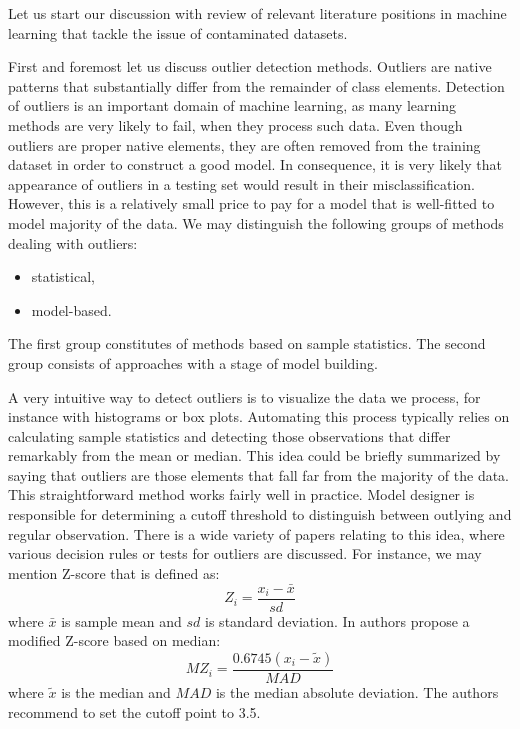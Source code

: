 \documentclass{llncs}
\begin{document}
Let us start our discussion with review of relevant literature positions in machine learning that tackle the issue of contaminated datasets. 

First and foremost let us discuss outlier detection methods. Outliers are native patterns that substantially differ from the remainder of class elements. Detection of outliers is an important domain of machine learning, as many learning methods are very likely to fail, when they process such data. Even though outliers are proper native elements, they are often removed from the training dataset in order to construct a good model. In consequence, it is very likely that appearance of outliers in a testing set would result in their misclassification. However, this is a relatively small price to pay for a model that is well-fitted to model majority of the data. We may distinguish the following groups of methods dealing with outliers:
\begin{itemize}
  \item statistical,
  \item model-based.
\end{itemize}

The first group constitutes of methods based on sample statistics. The second group consists of approaches with a stage of model building. 
 
A very intuitive way to detect outliers is to visualize the data we process, for instance with histograms or box plots. Automating this process typically relies on calculating sample statistics and detecting those observations that differ remarkably from the mean or median. This idea could be briefly summarized by saying that outliers are those elements that fall far from the majority of the data. This straightforward method works fairly well in practice. Model designer is responsible for determining a cutoff threshold to distinguish between outlying and regular observation. There is a wide variety of papers relating to this idea, where various decision rules or tests for outliers are discussed. For instance, we may mention Z-score that is defined as:
\begin{equation}\label{eqn:zscore}
    Z_i = \frac{x_i - \bar{x}}{sd}
\end{equation}
where $\bar{x}$ is sample mean and $sd$ is standard deviation. In \cite{IglewiczHoaglin1993} authors propose a modified Z-score based on median:
\begin{equation}\label{eqn:modifiedzscore}
    MZ_i = \frac{0.6745(x_i - \tilde{x})}{MAD}
\end{equation}
where $\tilde{x}$ is the median and $MAD$ is the median absolute deviation. The authors recommend to set the cutoff point to 3.5. 
\end{document}
